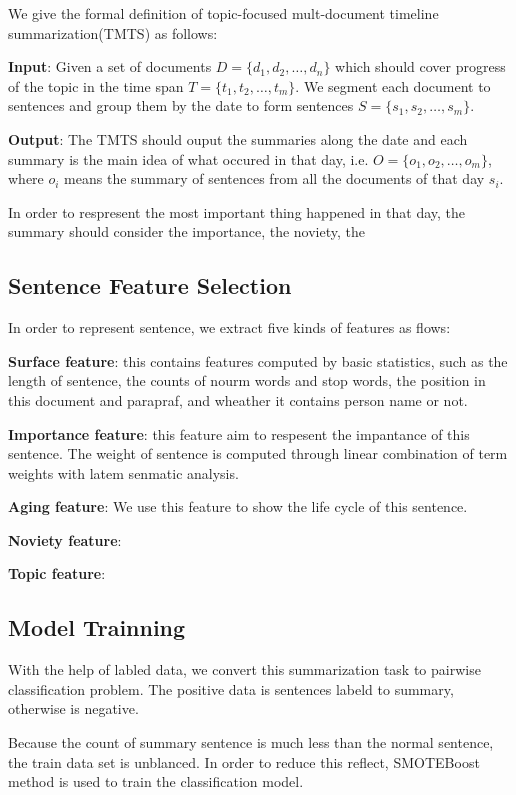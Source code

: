 \documentclass{llncs}
\begin{document}
We give the formal definition of topic-focused mult-document timeline summarization(TMTS) as follows:

\textbf{Input}: Given a set of documents $D=\{d_1, d_2, \dots, d_n\}$ which should cover progress of the topic in the time span $T=\{t_1, t_2, \dots, t_m\}$. We segment each document to sentences and group them by the date to form sentences $S=\{s_1, s_2, \dots, s_m\}$. 

\textbf{Output}: The TMTS should ouput the summaries along the date and each summary is the main idea of what occured in that day, i.e. $O=\{o_1, o_2, \dots, o_m\}$, where $o_i$ means the summary of sentences from all the documents of that day $s_i$. 

In order to respresent the most important thing happened in that day, the summary should consider the importance, the noviety, the  

\subsection{Sentence Feature Selection}

In order to represent sentence, we extract five kinds of features as flows:

\textbf{Surface feature}: this contains features computed by basic statistics, such as the length of sentence, the counts of nourm words and stop words, the position in this document and parapraf, and wheather it contains person name or not.

\textbf{Importance feature}: this feature aim to respesent the impantance of this sentence. The weight of sentence is computed through linear combination of term weights with latem senmatic analysis.

\textbf{Aging feature}: We use this feature to show the life cycle of this sentence.

\textbf{Noviety feature}: 

\textbf{Topic feature}: 


\subsection{Model Trainning}

With the help of labled data, we convert this summarization task to pairwise classification problem. The positive data is sentences labeld to summary, otherwise is negative. 

Because the count of summary sentence is much less than the normal sentence, the train data set is unblanced. In order to reduce this reflect, SMOTEBoost method is used to train the classification model.
\end{document}
